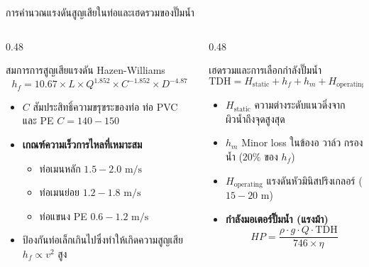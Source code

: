 \documentclass[aspectratio=169, 10pt]{beamer}
\begin{document}
\begin{frame}{การคำนวณแรงดันสูญเสียในท่อและเฮดรวมของปั๊มน้ำ}
\begin{columns}[T]
    \begin{column}{0.48\textwidth}
        \begin{mastercard}{สมการการสูญเสียแรงดัน Hazen-Williams}
            \begin{equation*}
                h_f = 10.67 \times L \times Q^{1.852} \times C^{-1.852} \times D^{-4.87}
            \end{equation*}
            \begin{itemize}
                \item $C$ สัมประสิทธิ์ความขรุขระของท่อ ท่อ PVC และ PE $C = 140 - 150$
                \item \textbf{เกณฑ์ความเร็วการไหลที่เหมาะสม}
                \begin{itemize}
                    \item ท่อเมนหลัก $1.5 - 2.0\text{ m/s}$
                    \item ท่อเมนย่อย $1.2 - 1.8\text{ m/s}$
                    \item ท่อแขนง PE $0.6 - 1.2\text{ m/s}$
                \end{itemize}
                \item ป้องกันท่อเล็กเกินไปซึ่งทำให้เกิดความสูญเสีย $h_f \propto v^2$ สูง
            \end{itemize}
        \end{mastercard}
    \end{column}
    \begin{column}{0.48\textwidth}
        \begin{goldcard}{เฮดรวมและการเลือกกำลังปั๊มน้ำ}
            \begin{equation*}
                \text{TDH} = H_{\text{static}} + h_f + h_m + H_{\text{operating}}
            \end{equation*}
            \begin{itemize}
                \item $H_{\text{static}}$ ความต่างระดับแนวดิ่งจากผิวน้ำถึงจุดสูงสุด
                \item $h_m$ Minor loss ในข้องอ วาล์ว กรองน้ำ ($20\%$ ของ $h_f$)
                \item $H_{\text{operating}}$ แรงดันหัวมินิสปริงเกลอร์ ($15 - 20\text{ m}$)
                \item \textbf{กำลังมอเตอร์ปั๊มน้ำ (แรงม้า)}
                \begin{equation*}
                    HP = \frac{\rho \cdot g \cdot Q \cdot \text{TDH}}{746 \times \eta}
                \end{equation*}
            \end{itemize}
        \end{goldcard}
    \end{column}
\end{columns}
\end{frame}
\end{document}
